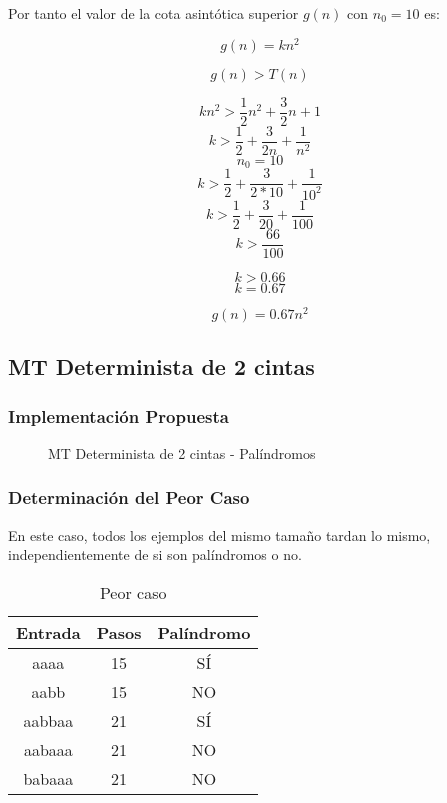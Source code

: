 \documentclass{uc3mpracticas}
\begin{document}
  Por tanto el valor de la cota asintótica superior $g(n)$ con $n_0 = 10$ es:

  $$ g(n) = kn^2 $$

  $$ g(n) > T(n) $$

  $$ kn^2 > \frac{1}{2}n^2 + \frac{3}{2}n + 1 $$
  $$ k > \frac{1}{2} + \frac{3}{2n} + \frac{1}{n^2}$$
  $$ n_0 = 10 $$
  $$ k > \frac{1}{2} + \frac{3}{2 * 10} + \frac{1}{10^2}$$
  $$ k > \frac{1}{2} + \frac{3}{20} + \frac{1}{100}$$
  $$ k > \frac{66}{100}$$

  $$ k > 0.66 $$
  $$ k = 0.67 $$

  $$ g(n) = 0.67n^2 $$






  \subsection{MT Determinista de 2 cintas}

  \subsubsection{Implementación Propuesta}


  \begin{figure}[!h]
    \caption{MT Determinista de 2 cintas - Palíndromos}
  \end{figure}


  \subsubsection{Determinación del Peor Caso}

  En este caso, todos los ejemplos del mismo tamaño tardan lo mismo, independientemente de si son palíndromos o no.


  \begin{table}[!h]
    \centering
  \begin{tabular}{|c|c|c|}
  \hline

  \textbf{Entrada} & \textbf{Pasos} & \textbf{Palíndromo} \\ \hline

  aaaa             & 15             & SÍ                  \\ \hline
  aabb             & 15             & NO                  \\ \hline
  aabbaa           & 21             & SÍ                  \\ \hline
  aabaaa           & 21             & NO                  \\ \hline
  babaaa           & 21             & NO                  \\ \hline
  \end{tabular}
  \caption{Peor caso}
  \end{table}
\end{document}
